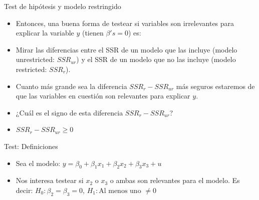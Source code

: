 \documentclass{beamer}
\begin{document}
\begin{frame}[t]{Test de hipótesis y modelo restringido}
    \begin{itemize}
    \item Entonces, una buena forma de testear si variables son irrelevantes para
    explicar la variable $y$ (tienen $\beta's = 0$) es:
    
    \item Mirar las diferencias entre el SSR de un modelo que las incluye (modelo
        unrestricted: $SSR_{ur}$) y el SSR de un modelo que no las incluye (modelo
        restricted: $SSR_{r}$).
        \item Cuanto más grande sea la diferencia $SSR_{r} - SSR_{ur}$ más seguros estaremos de
        que las variables en cuestión son relevantes para explicar $y$.
        \item ¿Cuál es el signo de esta diferencia $SSR_{r} - SSR_{ur}$?
        \pause
        \item \(SSR_{r} - SSR_{ur} \geq 0\)
    \end{itemize}
\end{frame}

\begin{frame}[t]{Test: Definiciones}
\begin{itemize}
    \item Sea el modelo: \( y = \beta_0 + \beta_1 x_1 + \beta_2 x_2 + \beta_3 x_3 + u \)
    \item Nos interesa testear si \( x_2 \) o \( x_3 \) o ambas son relevantes para el modelo.
    Es decir: \( H_0: \beta_2 = \beta_3 = 0 \), \( H_1: \text{Al menos uno }\neq 0\)
\end{itemize}
\end{frame}
\end{document}
